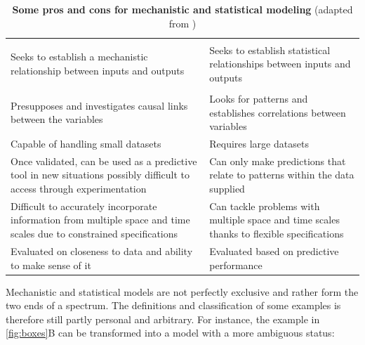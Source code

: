 \documentclass[a4paper,12pt,twoside,onecolumn,openright,final,oldfontcommands]{memoir}
\begin{document}
\begin{table}

\caption{\label{tab:mechstat}\textbf{Some pros and cons for mechanistic and
statistical modeling} (adapted from \citet{baker2018mechanistic})}
\centering
\begin{tabular}[t]{>{\raggedright\arraybackslash}p{15em}||>{\raggedright\arraybackslash}p{15em}}
\hline
\rowcolor[HTML]{808080}  \multicolumn{1}{>{\centering\arraybackslash}p{15em}}{\textcolor{white}{\textbf{Mechanistic modeling}}} & \multicolumn{1}{>{\centering\arraybackslash}p{15em}}{\textcolor{white}{\textbf{Statistical modeling}}}\\
\hline
\multicolumn{2}{l}{\textbf{Definition}}\\
\hline
\hspace{1em}Seeks to establish a mechanistic relationship between inputs and outputs & Seeks to establish statistical relationships between inputs and outputs\\
\hline
\multicolumn{2}{l}{\textbf{Pros and cons}}\\
\hline
\hspace{1em}Presupposes and investigates causal links between the variables & Looks for patterns and establishes correlations between variables\\
\hline
\hspace{1em}Capable of handling small datasets & Requires large datasets\\
\hline
\hspace{1em}Once validated, can be used as a predictive tool in new situations possibly difficult to access through experimentation & Can only make predictions that relate to patterns within the data supplied\\
\hline
\hspace{1em}Difficult to accurately incorporate information from multiple space and time scales due to constrained specifications & Can tackle problems with multiple space and time scales thanks to flexible specifications\\
\hline
\hspace{1em}Evaluated on closeness to data and ability to make sense of it & Evaluated based on predictive performance\\
\hline
\end{tabular}
\end{table}




Mechanistic and statistical models are not perfectly exclusive and
rather form the two ends of a spectrum. The definitions and
classification of some examples is therefore still partly personal and
arbitrary. For instance, the example in \ref{fig:boxes}B can be
transformed into a model with a more ambiguous status:
\end{document}
